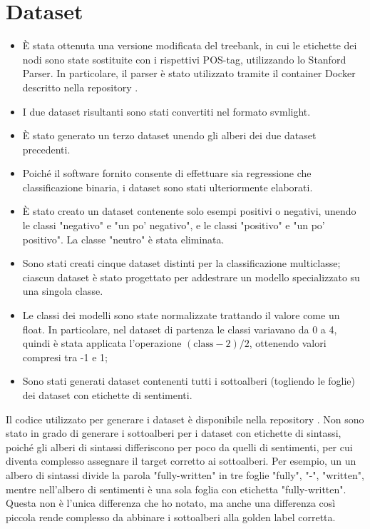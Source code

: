 \section{Dataset}

\begin{itemize}

\item È stata ottenuta una versione modificata del treebank, in cui le etichette 
    dei nodi sono state sostituite con i rispettivi POS-tag, utilizzando lo 
    Stanford Parser. In particolare, il parser è stato utilizzato tramite il 
    container Docker descritto nella repository \cite{docker-parser}.
\item I due dataset risultanti sono stati convertiti nel formato svmlight.
\item È stato generato un terzo dataset unendo gli alberi dei due dataset 
    precedenti.
\item Poiché il software fornito consente di effettuare sia regressione che 
    classificazione binaria, i dataset sono stati ulteriormente elaborati.
\item È stato creato un dataset contenente solo esempi positivi o negativi, 
    unendo le classi "negativo" e "un po' negativo", e le classi "positivo" e 
    "un po' positivo". La classe "neutro" è stata eliminata.
\item Sono stati creati cinque dataset distinti per la classificazione 
    multiclasse; ciascun dataset è stato progettato per addestrare un modello 
    specializzato su una singola classe.
\item Le classi dei modelli sono state normalizzate trattando il valore come un 
    float. In particolare, nel dataset di partenza le classi variavano da 0 a 4, 
    quindi è stata applicata l'operazione $(\text{class} - 2) / 2$, ottenendo 
    valori compresi tra -1 e 1;
\item Sono stati generati dataset contenenti tutti i sottoalberi (togliendo le
    foglie) dei dataset con etichette di sentimenti.
\end{itemize}

Il codice utilizzato per generare i dataset è disponibile nella repository 
\cite{repo}. Non sono stato in grado di generare i sottoalberi per i dataset
con etichette di sintassi, poiché gli alberi di sintassi differiscono per poco
da quelli di sentimenti, per cui diventa complesso assegnare il target corretto
ai sottoalberi. Per esempio, un un albero di sintassi divide la parola
"fully-written" in tre foglie "fully", "-", "written", mentre nell'albero di
sentimenti è una sola foglia con etichetta "fully-written". Questa non è l'unica
differenza che ho notato, ma anche una differenza così piccola rende complesso
da abbinare i sottoalberi alla golden label corretta.
